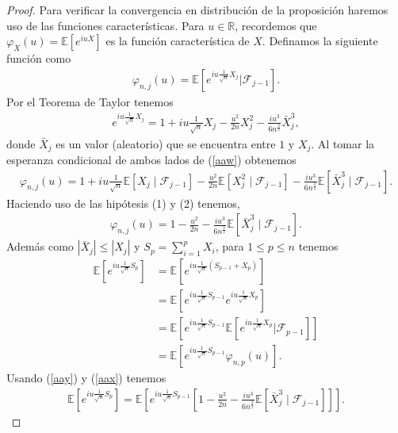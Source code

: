 \begin{proof}
Para verificar la convergencia en distribución de la proposición haremos uso de las funciones características. Para $u \in \mathbb{R}$, recordemos que $\varphi_X (u) = \mathbb{E}[e^{iuX}]$ es la función característica de $X$. Definamos la siguiente función  como
	\begin{align*}
	\varphi_{n, j} (u) = \mathbb{E}\left[e^{iu \frac{1}{\sqrt{n}} X_j} \bigg| \mathcal{F}_{j-1}\right].
	\end{align*}
Por el Teorema de Taylor \cite[p.~358]{apostol} tenemos
	\begin{align}
	e^{iu \frac{1}{\sqrt{n}} X_j} = 1 + iu \frac{1}{\sqrt{n}} X_j - \frac{u^2}{2n} X_j^2 - \frac{iu^3}{6n^{\frac{3}{2}}} \bar{X}_j^3, \label{aaw}
	\end{align}
donde $\bar{X}_j$ es un valor (aleatorio) que se encuentra entre $1$ y $X_j$. Al tomar la esperanza condicional de ambos lados de (\ref{aaw}) obtenemos
	\begin{align*}
	\varphi_{n, j} (u) = 1 + iu \frac{1}{\sqrt{n}} \mathbb{E}[X_j \mid \mathcal{F}_{j-1}] - \frac{u^2}{2n} \mathbb{E}[X_j^2 \mid \mathcal{F}_{j-1}] - \frac{iu^3}{6n^{\frac{3}{2}}} \mathbb{E}[\bar{X}_j^3 \mid \mathcal{F}_{j-1}].
	\end{align*}
Haciendo uso de las hipótesis (1) y (2) tenemos,
	\begin{align}
	\varphi_{n, j} (u) = 1 - \frac{u^2}{2n} - \frac{iu^3}{6n^{\frac{3}{2}}} \mathbb{E}[\bar{X}_j^3 \mid \mathcal{F}_{j-1}]. \label{aax}
	\end{align}
Además como $|\bar{X}_j| \leq |X_j|$ y $S_p = \sum_{i=1}^p X_i$, para $1 \leq p \leq n$ tenemos
	\begin{align}
	\mathbb{E}\left[e^{iu \frac{1}{\sqrt{n}} S_p} \right] & = \mathbb{E}\left[e^{iu \frac{1}{\sqrt{n}} (S_{p-1} + X_p) } \right] \nonumber \\
	& = \mathbb{E}\left[e^{iu \frac{1}{\sqrt{n}} S_{p-1}} e^{iu \frac{1}{\sqrt{n}} X_p} \right] \nonumber \\ 
	& = \mathbb{E}\left[e^{iu \frac{1}{\sqrt{n}} S_{p-1}} \mathbb{E}\left[e^{iu \frac{1}{\sqrt{n}} X_p} \bigg| \mathcal{F}_{p-1} \right]\right] \nonumber \\ 
	& = \mathbb{E}\left[e^{iu \frac{1}{\sqrt{n}} S_{p-1}} \varphi_{n, p} (u) \right] \label{aay}.
	\end{align}
Usando (\ref{aay}) y (\ref{aax}) tenemos
	\begin{align*}
	\mathbb{E}\left[e^{iu \frac{1}{\sqrt{n}} S_p} \right] = \mathbb{E}\left[e^{iu \frac{1}{\sqrt{n}} S_{p-1}} \left[ 1 - \frac{u^2}{2n} - \frac{iu^3}{6n^{\frac{3}{2}}} \mathbb{E}[\bar{X}_j^3 \mid \mathcal{F}_{j-1}] \right]\right].

\end{align*}
\end{proof}
